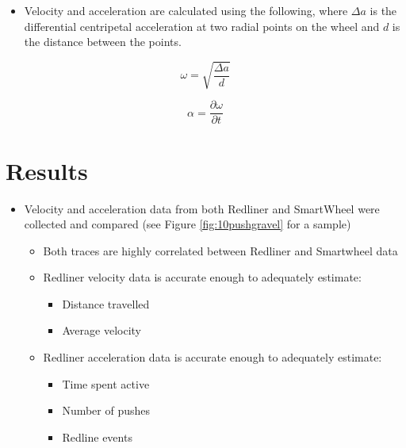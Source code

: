 \documentclass[a0,landscape]{a0poster}
\begin{document}
\begin{multicols*}{3}
\begin{itemize}
    \item Velocity and acceleration are calculated using the following, where $\Delta a$ is the differential centripetal acceleration at two radial points on the wheel and $d$ is the distance between the points.
\end{itemize}

\begin{minipage}{0.5\columnwidth}
    \begin{equation}
        \omega = \sqrt{\frac{\Delta a}{d}}
        \label{equ:velocity}
    \end{equation}
\end{minipage}
%
\begin{minipage}{0.5\columnwidth}
    \begin{equation}
        \alpha = \frac{\partial \omega}{\partial t}
        \label{equ:acceleration}
    \end{equation}
\end{minipage}

\section*{Results}
\begin{itemize}
    \item Velocity and acceleration data from both Redliner and SmartWheel were collected and compared (see Figure \ref{fig:10pushgravel} for a sample)
    \begin{itemize}
        \item Both traces are highly correlated between Redliner and Smartwheel data
        \item Redliner velocity data is accurate enough to adequately estimate:
        \begin{itemize}
            \item Distance travelled
            \item Average velocity
        \end{itemize}
        \item Redliner acceleration data is accurate enough to adequately estimate:
        \begin{itemize}
            \item Time spent active
            \item Number of pushes
            \item Redline events
        \end{itemize}
    \end{itemize}
\end{itemize}


\end{multicols*}
\end{document}
